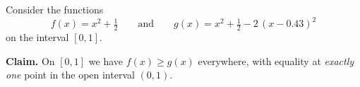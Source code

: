 \begin{problem}
Consider the functions
\[
  f(x) = x^{2} + \tfrac{1}{2}
  \qquad \text{and} \qquad
  g(x) = x^{2} + \tfrac{1}{2} - 2\,(x - 0.43)^{2}
\]
on the interval $[0, 1]$.

\textbf{Claim.} On $[0, 1]$ we have $f(x) \geq g(x)$ everywhere, with
equality at \emph{exactly one} point in the open interval $(0, 1)$.
\end{problem}
